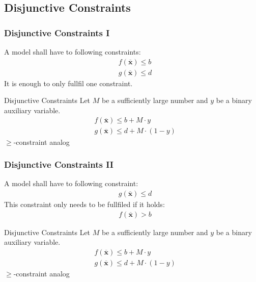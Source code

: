 \subsection{Disjunctive Constraints}
\begin{frame}
 \frametitle{Disjunctive Constraints I}
 A model shall have to following constraints:
 \begin{align*}
  &f(\mathbf{\overline{x}}) \leq b\\
  &g(\mathbf{\overline{x}}) \leq d
 \end{align*}
 It is enough to only fullfil one constraint.
 
 \begin{block}{Disjunctive Constraints}
 Let $M$ be a sufficiently large number and $y$ be a binary auxiliary variable.
 \begin{align*}
  &f(\mathbf{\overline{x}}) \leq b + M\cdot y\\
  &g(\mathbf{\overline{x}}) \leq d + M\cdot (1-y)
 \end{align*}
 \footnotesize $\geq$-constraint analog
 \end{block}
\end{frame}

\begin{frame}
 \frametitle{Disjunctive Constraints II}
 A model shall have to following constraint:
 \begin{align*}
  &g(\mathbf{\overline{x}}) \leq d
 \end{align*}
 This constraint only needs to be fullfiled if it holds:
 \begin{align*}
  &f(\mathbf{\overline{x}}) > b
 \end{align*}
 
 \begin{block}{Disjunctive Constraints}
 Let $M$ be a sufficiently large number and $y$ be a binary auxiliary variable.
 \begin{align*}
  &f(\mathbf{\overline{x}}) \leq b + M\cdot y\\
  &g(\mathbf{\overline{x}}) \leq d + M\cdot (1-y)
 \end{align*}
 \footnotesize $\geq$-constraint analog
 \end{block}
\end{frame}
